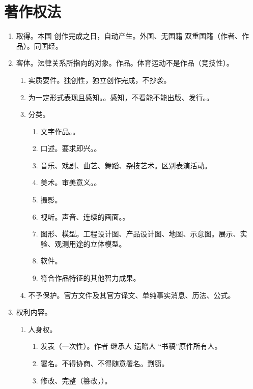 \section{著作权法}
\begin{enumerate}
  \item 取得。本国 \yjt 创作完成之日，自动产生。外国、无国籍 \yjt 双重国籍（作者、作品）。同国经。
  \item 客体。法律关系所指向的对象。作品。体育运动不是作品（竞技性）。
        \begin{enumerate}
          \item 实质要件。独创性，独立创作完成，不抄袭。
          \item 为一定形式表现且感知。。感知，不看能不能出版、发行。。
          \item 分类。
                \begin{enumerate}
                  \item 文字作品。。
                  \item 口述。要求即兴。。
                  \item 音乐、戏剧、曲艺、舞蹈、杂技艺术。区别表演活动。
                  \item 美术。审美意义。。
                  \item 摄影。
                  \item 视听。声音、连续的画面。。
                  \item 图形、模型。工程设计图、产品设计图、地图、示意图。展示、实验、观测用途的立体模型。
                  \item 软件。
                  \item 符合作品特征的其他智力成果。
                \end{enumerate}
          \item 不予保护。官方文件及其官方译文、单纯事实消息、历法、公式。
        \end{enumerate}
  \item 权利内容。
        \begin{enumerate}
          \item 人身权。
                \begin{enumerate}
                  \item 发表（一次性）。作者 \yjt 继承人 \hz 遗赠人 \yjt “书稿”原件所有人。
                  \item 署名。不得协商、不得随意署名。剽窃。
                  \item 修改、完整（篡改，）。

\end{enumerate}
\end{enumerate}
\end{enumerate}
